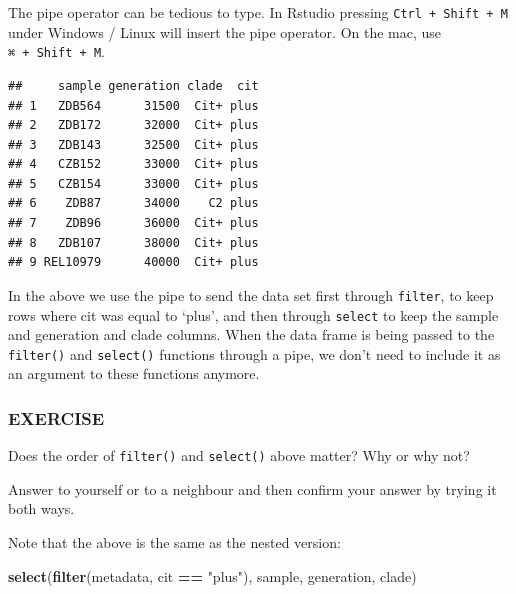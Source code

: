 \documentclass[]{book}
\newenvironment{Shaded}{\begin{snugshade}}{\end{snugshade}}
\newcommand{\KeywordTok}[1]{\textcolor[rgb]{0.13,0.29,0.53}{\textbf{#1}}}
\newcommand{\NormalTok}[1]{#1}
\newcommand{\OperatorTok}[1]{\textcolor[rgb]{0.81,0.36,0.00}{\textbf{#1}}}
\newcommand{\StringTok}[1]{\textcolor[rgb]{0.31,0.60,0.02}{#1}}
\begin{document}
The pipe operator can be tedious to type. In Rstudio pressing \texttt{Ctrl\ +\ Shift\ +\ M} under Windows / Linux will insert the pipe operator. On the mac, use \texttt{⌘\ +\ Shift\ +\ M}.

\begin{Shaded}
\end{Shaded}

\begin{verbatim}
##     sample generation clade  cit
## 1   ZDB564      31500  Cit+ plus
## 2   ZDB172      32000  Cit+ plus
## 3   ZDB143      32500  Cit+ plus
## 4   CZB152      33000  Cit+ plus
## 5   CZB154      33000  Cit+ plus
## 6    ZDB87      34000    C2 plus
## 7    ZDB96      36000  Cit+ plus
## 8   ZDB107      38000  Cit+ plus
## 9 REL10979      40000  Cit+ plus
\end{verbatim}

In the above we use the pipe to send the data set first through \texttt{filter}, to keep rows where cit was equal to `plus', and then through \texttt{select} to keep the sample and generation and clade columns. When the data frame is being passed to the \texttt{filter()} and \texttt{select()} functions through a pipe, we don't need to include it as an argument to these functions anymore.

\hypertarget{exercise-16}{%
\subsubsection*{EXERCISE}\label{exercise-16}}

Does the order of \texttt{filter()} and \texttt{select()} above matter? Why or why not?

Answer to yourself or to a neighbour and then confirm your answer by trying it both ways.

Note that the above is the same as the nested version:

\begin{Shaded}
\begin{Highlighting}[]
\KeywordTok{select}\NormalTok{(}\KeywordTok{filter}\NormalTok{(metadata, cit }\OperatorTok{==}\StringTok{ "plus"}\NormalTok{), sample, generation, clade)}
\end{Highlighting}
\end{Shaded}
\end{document}
